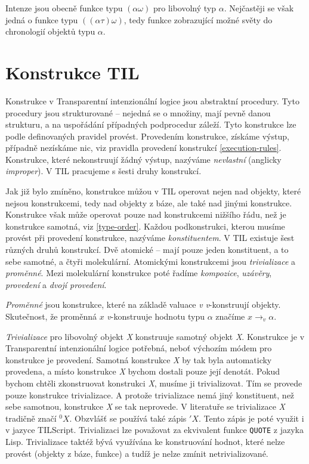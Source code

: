 Intenze jsou obecně funkce typu $(\alpha\omega)$ pro libovolný typ $\alpha$. Nejčastěji se však
jedná o funkce typu $((\alpha\tau)\omega)$, tedy funkce zobrazující možné světy do chronologií
objektů typu $\alpha$.

\section{Konstrukce TIL}

Konstrukce v Transparentní intenzionální logice jsou abstraktní procedury. Tyto procedury jsou
strukturované -- nejedná se o množiny, mají pevně danou strukturu, a na uspořádání případných
podprocedur záleží. Tyto konstrukce lze podle definovaných pravidel provést. Provedením konstrukce,
získáme výstup, případně nezískáme nic, viz pravidla provedení konstrukcí \ref{execution-rules}.
Konstrukce, které nekonstruují žádný výstup, nazýváme \textit{nevlastní} (anglicky
\textit{improper}). V TIL pracujeme s šesti druhy konstrukcí.

Jak již bylo zmíněno, konstrukce můžou v TIL operovat nejen nad objekty, které nejsou konstrukcemi,
tedy nad objekty z báze, ale také nad jinými konstrukce. Konstrukce však může operovat pouze nad
konstrukcemi nižšího řádu, než je konstrukce samotná, viz \ref{type-order}. Každou podkonstrukci,
kterou musíme provést při provedení konstrukce, nazýváme \textit{konstituentem}. V TIL existuje
šest různých druhů konstrukcí. Dvě atomické -- mají pouze jeden konstituent, a to sebe samotné,
a čtyři molekulární. Atomickými konstrukcemi jsou \textit{trivializace} a \textit{proměnné}. Mezi
molekulární konstrukce poté řadíme \textit{kompozice}, \textit{uzávěry}, \textit{provedení} a
\textit{dvojí provedení}.

\textit{Proměnné} jsou konstrukce, které na základě valuace \textit{v} \textit{v}-konstruují
objekty. Skutečnost, že proměnná $x$ \textit{v}-konstruuje hodnotu typu $\alpha$ značíme
$x \rightarrow_v \alpha$.

\lstset{language=Lisp}
\textit{Trivializace} pro libovolný objekt \textit{X} konstruuje samotný objekt \textit{X}.
Konstrukce je v Transparentní intenzionální logice potřebná, neboť výchozím módem pro konstrukce
je provedení. Samotná konstrukce \textit{X} by tak byla automaticky provedena, a místo konstrukce
\textit{X} bychom dostali pouze její denotát. Pokud bychom chtěli zkonstruovat konstrukci
\textit{X}, musíme ji trivializovat. Tím se provede pouze konstrukce trivializace. A protože
trivializace nemá jiný konstituent, než sebe samotnou, konstrukce \textit{X} se tak neprovede.
V literatuře se trivializace \textit{X} tradičně značí ${}^0X$. Obzvlášť se používá také zápis
$'X$. Tento zápis je poté využit i v jazyce TILScript. Trivializaci lze považovat za ekvivalent
funkce \lstinline{QUOTE} z jazyka Lisp. Trivializace taktéž bývá využívána ke konstruování hodnot,
které nelze provést (objekty z báze, funkce) a tudíž je nelze zmínit netrivializované.

